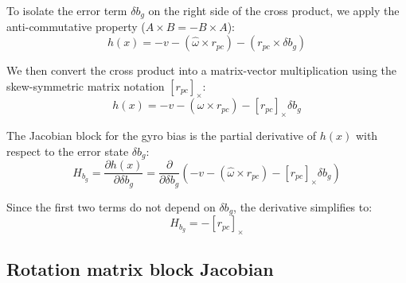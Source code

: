 \documentclass[report.tex]{subfiles}
\begin{document}
    To isolate the error term $\delta b_g$ on the right side of the cross product, we apply the anti-commutative property ($A \times B = -B \times A$):
    \begin{equation}
        h(x) = -v - (\hat{\omega} \times r_{pc}) - (r_{pc} \times \delta b_g)
    \end{equation}

    We then convert the cross product into a matrix-vector multiplication using the skew-symmetric matrix notation $[r_{pc}]_\times$:
    \begin{equation}
        h(x) = -v - (\hat{\omega} \times r_{pc}) - [r_{pc}]_\times \delta b_g
    \end{equation}

    The Jacobian block for the gyro bias is the partial derivative of $h(x)$ with respect to the error state $\delta b_g$:
    \begin{equation}
        H_{b_g} = \frac{\partial h(x)}{\partial \delta b_g} = \frac{\partial}{\partial \delta b_g} \left( -v - (\hat{\omega} \times r_{pc}) - [r_{pc}]_\times \delta b_g \right)
    \end{equation}

    Since the first two terms do not depend on $\delta b_g$, the derivative simplifies to:
    \begin{equation}
        H_{b_g} = -[r_{pc}]_\times
    \end{equation}                                          
    
    
    \subsection{Rotation matrix block Jacobian}
    
    
\end{document}
